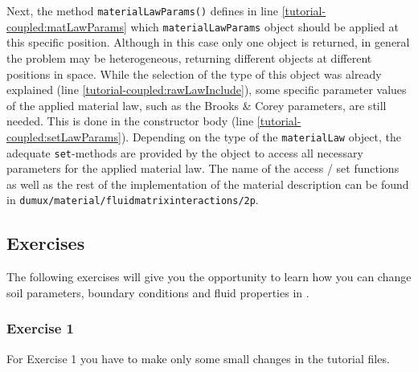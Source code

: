 Next, the method \texttt{materialLawParams()} defines in line 
\ref{tutorial-coupled:matLawParams} which \verb+materialLawParams+ object 
 should be applied at this specific position. Although in this case only one object is returned, 
in general the problem may be heterogeneous, returning different objects at different positions in space. 
While the selection of the type of this object was already explained (line \ref{tutorial-coupled:rawLawInclude}),
some specific parameter values of the applied material law, such as the Brooks \& Corey parameters, are still needed. This is 
done in the constructor body (line \ref{tutorial-coupled:setLawParams}).
Depending on the type of the \texttt{materialLaw} object, the adequate \texttt{set}-methods
are provided by the object to access all necessary parameters 
for the applied material law. The name of the access / set functions as well as the rest of the implementation 
of the material description can be found in 
\verb+dumux/material/fluidmatrixinteractions/2p+.

\subsection{Exercises}
\label{tutorial-coupled:exercises}
The following exercises will give you the opportunity to learn how you
can change soil parameters, boundary conditions and fluid properties
in \Dumux. 

\subsubsection{Exercise 1}
\renewcommand{\labelenumi}{\alph{enumi})} For Exercise 1 you have
to make only some small changes in the tutorial files.  

